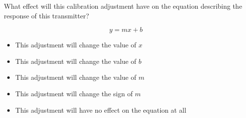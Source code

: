 What effect will this calibration adjustment have on the equation describing the response of this transmitter?

$$y = mx + b$$

\begin{itemize}
\item{} This adjustment will change the value of $x$ 
\vskip 5pt 
\item{} This adjustment will change the value of $b$
\vskip 5pt 
\item{} This adjustment will change the value of $m$ 
\vskip 5pt 
\item{} This adjustment will change the sign of $m$ 
\vskip 5pt 
\item{} This adjustment will have no effect on the equation at all 
\end{itemize}





